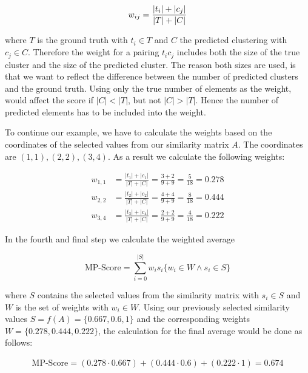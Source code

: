 \begin{equation}
    \label{equ:weight}
        w_{ij} = \frac{|t_i| + |c_j|}{|T|+|C|} \\
\end{equation}

where $T$ is the ground truth with $t_i \in T$ and $C$ the predicted clustering with  $c_j \in C$.
Therefore the weight for a pairing $t_ic_j$ includes both the size of the true cluster
and the size of the predicted cluster.
The reason both sizes are used,
is that we want to reflect the difference between the number of predicted clusters and the ground truth.
Using only the true number of elements as the weight, would affect the score if $|C| < |T|$, but not $|C| > |T|$.
Hence the number of predicted elements has to be included into the weight.

To continue our example,
we have to calculate the weights based on the coordinates of the selected values from our similarity matrix $A$.
The coordinates are $(1,1), (2,2), (3,4)$.
As a result we calculate the following weights:

\begin{align*}
    w_{1,1} &= \frac{|t_1| + |c_1|}{|T|+|C|} = \frac{3 + 2}{9 + 9} = \frac{5}{18} = 0.278 \\
    w_{2,2} &= \frac{|t_2| + |c_2|}{|T|+|C|} = \frac{4 + 4}{9 + 9} = \frac{8}{18} = 0.444 \\
    w_{3,4} &= \frac{|t_3| + |c_4|}{|T|+|C|} = \frac{2 + 2}{9 + 9} = \frac{4}{18} = 0.222
\end{align*}

In the fourth and final step we calculate the weighted average

\begin{equation}
    \label{equ:weighted_average}
        \text{MP-Score} = \sum_{i=0}^{|S|} w_is_i \{w_i \in W \wedge s_i \in S\}
\end{equation}

where $S$ contains the selected values from the similarity matrix
with $s_{i} \in S$ and $W$ is the set of weights with $w_i \in W$.
Using our previously selected similarity values $S = f(A) = \{0.667, 0.6, 1\}$
and the corresponding weights $W = \{0.278, 0.444, 0.222\}$,
the calculation for the final average would be done as follows:

\begin{align*}
    \text{MP-Score} = (0.278 \cdot 0.667) + (0.444 \cdot 0.6) + (0.222 \cdot 1) = \mathbf{0.674}
\end{align*}


